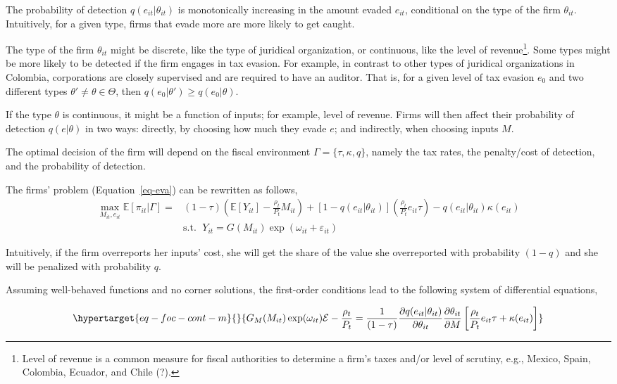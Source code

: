 \documentclass[
  12pt]{article}
\begin{document}
The probability of detection \(q(e_{it}|\theta_{it})\) is monotonically
increasing in the amount evaded \(e_{it}\), conditional on the type of
the firm \(\theta_{it}\). Intuitively, for a given type, firms that
evade more are more likely to get caught.

The type of the firm \(\theta_{it}\) might be discrete, like the type of
juridical organization, or continuous, like the level of
revenue\footnote{Level of revenue is a common measure for fiscal
  authorities to determine a firm's taxes and/or level of scrutiny,
  e.g., Mexico, Spain, Colombia, Ecuador, and Chile (?).}. Some types
might be more likely to be detected if the firm engages in tax evasion.
For example, in contrast to other types of juridical organizations in
Colombia, corporations are closely supervised and are required to have
an auditor. That is, for a given level of tax evasion \(e_0\) and two
different types \(\theta' \not= \theta \in \mathbfcal{\Theta}\), then
\(q(e_0|\theta')\ge q(e_0|\theta)\).

If the type \(\theta\) is continuous, it might be a function of inputs;
for example, level of revenue. Firms will then affect their probability
of detection \(q(e|\theta)\) in two ways: directly, by choosing how much
they evade \(e\); and indirectly, when choosing inputs \(M\).

The optimal decision of the firm will depend on the fiscal environment
\(\Gamma=\{\tau, \kappa, q \}\), namely the tax rates, the penalty/cost
of detection, and the probability of detection.

The firms' problem (Equation~\ref{eq-eva}) can be rewritten as follows,
\[
\begin{aligned}
  \max_{M_{it},e_{it}} \mathbb{E}[\pi_{it}|\Gamma] = &(1-\tau)\left(\mathbb{E}[Y_{it}]-\frac{\rho_{t}}{P_t} M_{it}\right)+[1-q(e_{it}|\theta_{it})]\left(\frac{\rho_{t}}{P_t}e_{it}\tau\right)
  -q(e_{it}|\theta_{it})\kappa(e_{it}) \\
  &\text{s.t. }\; Y_{it}=G(M_{it})\exp(\omega_{it}+\varepsilon_{it})
\end{aligned}
\]

Intuitively, if the firm overreports her inputs' cost, she will get the
share of the value she overreported with probability \((1-q)\) and she
will be penalized with probability \(q\).

Assuming well-behaved functions and no corner solutions, the first-order
conditions lead to the following system of differential equations,

\begin{equation}\protect\hypertarget{eq-foc-cont-m}{}{
G_M(M_{it})\exp(\omega_{it})\mathcal{E}-\frac{\rho_{t}}{P_t} = \frac{1}{(1-\tau)}\frac{\partial q(e_{it}|\theta_{it})}{\partial \theta_{it}}\frac{\partial \theta_{it}}{\partial M}\left[\frac{\rho_t}{P_t}e_{it}\tau+\kappa(e_{it})\right]
}\label{eq-foc-cont-m}\end{equation}
\end{document}
